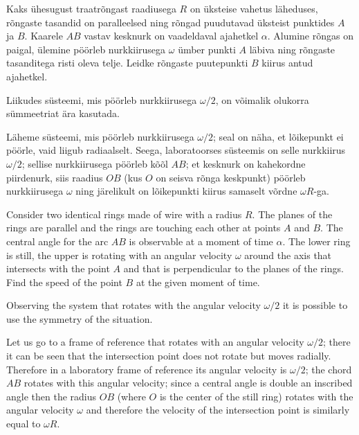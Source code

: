 
Kaks ühesugust traatrõngast raadiusega $R$ on üksteise vahetus läheduses, rõngaste tasandid on paralleelsed ning rõngad puudutavad üksteist punktides $A$ ja $B$. Kaarele $AB$ vastav kesknurk on vaadeldaval ajahetkel $\alpha$. Alumine rõngas on paigal, ülemine pöörleb nurkkiirusega $\omega$ ümber punkti $A$ läbiva ning rõngaste tasanditega risti oleva telje. Leidke rõngaste puutepunkti $B$ kiirus antud ajahetkel.

\hint
Liikudes süsteemi, mis pöörleb nurkkiirusega $\omega/2$, on võimalik olukorra sümmeetriat ära kasutada.

\solu
Läheme süsteemi, mis pöörleb nurkkiirusega $\omega/2$; seal on näha, et lõikepunkt ei pöörle, vaid liigub radiaalselt.
Seega, laboratoorses süsteemis on selle nurkkiirus $\omega/2$; sellise nurkkiirusega pöörleb kõõl $AB$; et kesknurk on kahekordne piirdenurk, siis 
raadius $OB$ (kus $O$ on seisva rõnga keskpunkt) pöörleb nurkkiirusega $\omega$ ning järelikult on lõikepunkti kiirus samaselt võrdne $\omega R$-ga.

Consider two identical rings made of wire with a radius $R$. The planes of the rings are parallel and the rings are touching each other at points $A$ and $B$. The central angle for the arc $AB$ is observable at a moment of time $\alpha$. The lower ring is still, the upper is rotating with an angular velocity $\omega$ around the axis that intersects with the point $A$ and that is perpendicular to the planes of the rings. Find the speed of the point $B$ at the given moment of time.

\hinteng
Observing the system that rotates with the angular velocity $\omega/2$ it is possible to use the symmetry of the situation.

\solueng
Let us go to a frame of reference that rotates with an angular velocity $\omega/2$; there it can be seen that the intersection point does not rotate but moves radially. Therefore in a laboratory frame of reference its angular velocity is $\omega/2$; the chord $AB$ rotates with this angular velocity; since a central angle is double an inscribed angle then the radius $OB$ (where $O$ is the center of the still ring) rotates with the angular velocity $\omega$ and therefore the velocity of the intersection point is similarly equal to $\omega R$.
\probend